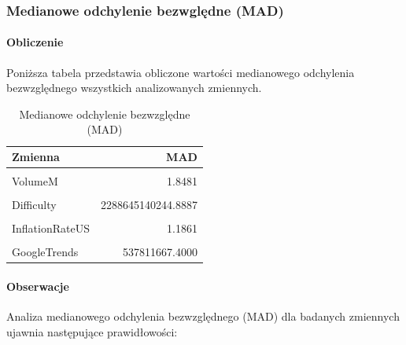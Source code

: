 \documentclass[
  11pt,
]{article}
\begin{document}
\pagebreak

\subsubsection{Medianowe odchylenie bezwględne
(MAD)}\label{medianowe-odchylenie-bezwglux119dne-mad}

\paragraph{\texorpdfstring{Obliczenie
\newline}{Obliczenie }}\label{obliczenie-4}

Poniższa tabela przedstawia obliczone wartości medianowego odchylenia
bezwzględnego wszystkich analizowanych zmiennych.

\begin{table}[!h]
\centering
\caption{\label{tab:unnamed-chunk-8}Medianowe odchylenie bezwzględne (MAD)}
\centering
\begin{tabular}[t]{lr}
\toprule
Zmienna & MAD\\
\midrule
\cellcolor{gray!10}{Price} & \cellcolor{gray!10}{6266.1348}\\
VolumeM & 1.8481\\
\cellcolor{gray!10}{USAvgKWHPrice} & \cellcolor{gray!10}{0.0059}\\
Difficulty & 2288645140244.8887\\
\cellcolor{gray!10}{BTCCirculation} & \cellcolor{gray!10}{3655341.4044}\\
\addlinespace
InflationRateUS & 1.1861\\
\cellcolor{gray!10}{HasMuskMentioned} & \cellcolor{gray!10}{0.0000}\\
GoogleTrends & 537811667.4000\\
\bottomrule
\end{tabular}
\end{table}

\paragraph{Obserwacje}\label{obserwacje-7}

Analiza medianowego odchylenia bezwzględnego (MAD) dla badanych
zmiennych ujawnia następujące prawidłowości:
\end{document}
